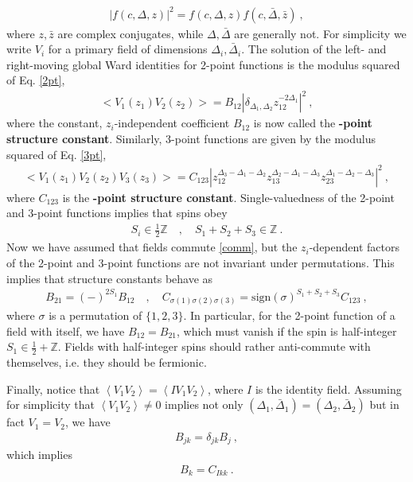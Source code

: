 \documentclass[12pt, a4paper]{article}
\newcommand{\myindex}[1]{\textbf{\boldmath #1}}
\begin{document}
\begin{align}
 \left| f(c,\Delta, z)\right|^2 = f(c,\Delta, z)f(c,\bar\Delta,\bar z)\ ,
 \label{fdz2}
\end{align}
where $z,\bar z$ are complex conjugates, while $\Delta,\bar\Delta$ are generally not. 
For simplicity we write $V_i$ for a primary field of dimensions $\Delta_i,\bar\Delta_i$.
The solution of the left- and right-moving global Ward identities for 2-point functions is the modulus squared of Eq. \eqref{2pt},
\begin{align}
\boxed{ \Big< V_1(z_1)V_2(z_2) \Big> = B_{12} \left|\delta_{\Delta_1,\Delta_2} z_{12}^{-2\Delta_1}\right|^2} \ ,
\label{2ptb}
\end{align}
where the constant, $z_i$-independent coefficient $B_{12}$ is now called the \myindex{2-point structure constant}. Similarly, 3-point functions are given by the modulus squared of Eq. \eqref{3pt},
\begin{align}
 \boxed{  \Big< V_1(z_1)V_2(z_2)V_3(z_3) \Big> = C_{123} \left|z_{12}^{\Delta_3-\Delta_1-\Delta_2} z_{13}^{\Delta_2-\Delta_1-\Delta_3} z_{23}^{\Delta_1-\Delta_2-\Delta_3}\right|^2 }\ ,
 \label{3ptc}
\end{align}
where $C_{123}$ is the \myindex{3-point structure constant}. Single-valuedness of the 2-point and 3-point functions implies that spins obey
\begin{align}
 S_i\in\frac12 \mathbb{Z} \quad , \quad S_1+S_2+S_3 \in\mathbb{Z}\ . 
 \label{sihz}
\end{align}
Now we have assumed that fields commute \eqref{comm}, but the $z_i$-dependent factors of the 2-point and 3-point functions are not invariant under permutations. This implies that structure constants behave as
\begin{align}
 B_{21} = (-)^{2S_1} B_{12} \quad ,\quad C_{\sigma(1)\sigma(2)\sigma(3)} = \text{sign}(\sigma)^{S_1+S_2+S_3} C_{123}\ , 
 \label{b21}
\end{align}
where $\sigma$ is a permutation of $\{1,2,3\}$. In particular, for the 2-point function of a field with itself, we have $B_{12}=B_{21}$, which must vanish if the spin is half-integer $S_1\in \frac12+\mathbb{Z}$. Fields with half-integer spins should rather anti-commute with themselves, i.e. they should be fermionic. 

Finally, notice that $\left<V_1V_2\right> = \left<IV_1V_2\right>$, where $I$ is the identity field. Assuming for simplicity that $\left<V_1V_2\right>\neq 0$ implies
not only $(\Delta_1,\bar \Delta_1)=(\Delta_2,\bar\Delta_2)$ but in fact
$V_1=V_2$, we have
\begin{align}
 B_{jk}=\delta_{jk}B_j\ ,
 \label{djkbj}
\end{align}
which implies
\begin{align}
 \boxed{B_k = C_{Ikk}}\ .
 \label{bicii}
\end{align}
\end{document}
